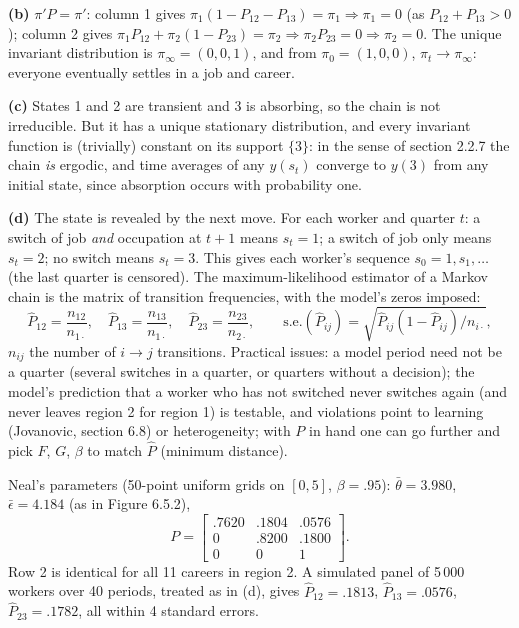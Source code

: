 \documentclass[12pt, letterpaper]{article}
\begin{document}
\begin{tcolorbox}[evenbox,title={Exercise 6.26 \quad Neal Model's Markov Implications}]
\textbf{(b)} $\pi'P=\pi'$: column 1 gives $\pi_1(1-P_{12}-P_{13})=\pi_1\Rightarrow\pi_1=0$ (as $P_{12}+P_{13}>0$); column 2 gives
$\pi_1P_{12}+\pi_2(1-P_{23})=\pi_2\Rightarrow\pi_2P_{23}=0\Rightarrow\pi_2=0$. The unique invariant distribution is
$\boxed{\pi_\infty=(0,0,1)}$, and from $\pi_0=(1,0,0)$, $\pi_t\to\pi_\infty$: everyone eventually settles in a job and career.

\textbf{(c)} States 1 and 2 are transient and 3 is absorbing, so the chain is not irreducible. But it has a unique
stationary distribution, and every invariant function is (trivially) constant on its support $\{3\}$: in the
sense of section 2.2.7 the chain \emph{is} ergodic, and time averages of any $y(s_t)$ converge to $y(3)$ from any
initial state, since absorption occurs with probability one.

\textbf{(d)} The state is revealed by the next move. For each worker and quarter $t$: a switch of job
\emph{and} occupation at $t+1$ means $s_t=1$; a switch of job only means $s_t=2$; no switch means $s_t=3$.
This gives each worker's sequence $s_0=1,s_1,\dots$ (the last quarter is censored). The maximum-likelihood
estimator of a Markov chain is the matrix of transition frequencies, with the model's zeros imposed:
\[
\hat P_{12}=\frac{n_{12}}{n_{1\cdot}},\quad\hat P_{13}=\frac{n_{13}}{n_{1\cdot}},\quad\hat P_{23}=\frac{n_{23}}{n_{2\cdot}},\qquad
\text{s.e.}(\hat P_{ij})=\sqrt{\hat P_{ij}(1-\hat P_{ij})/n_{i\cdot}},
\]
$n_{ij}$ the number of $i\to j$ transitions. Practical issues: a model period need not be a quarter (several
switches in a quarter, or quarters without a decision); the model's prediction that a worker who has not
switched never switches again (and never leaves region 2 for region 1) is testable, and violations point
to learning (Jovanovic, section 6.8) or heterogeneity; with $P$ in hand one can go further and pick $F$, $G$,
$\beta$ to match $\hat P$ (minimum distance).

\begin{tcolorbox}[databox]
Neal's parameters (50-point uniform grids on $[0,5]$, $\beta=.95$): $\bar\theta=3.980$, $\bar\epsilon=4.184$ (as in Figure 6.5.2),
\[
P=\begin{bmatrix}.7620&.1804&.0576\\0&.8200&.1800\\0&0&1\end{bmatrix}.
\]
Row 2 is identical for all 11 careers in region 2. A simulated panel of 5\,000 workers over 40 periods,
treated as in (d), gives $\hat P_{12}=.1813$, $\hat P_{13}=.0576$, $\hat P_{23}=.1782$, all within 4 standard errors.
\end{tcolorbox}
\end{tcolorbox}
\end{document}
